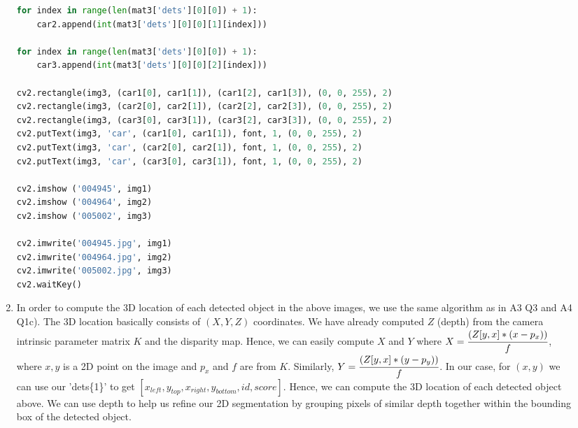 \documentclass{csc_assignment4}
\begin{document}
\begin{description}
\begin{enumerate}[label=(\alph*)]
\begin{lstlisting}[language=Python]
for index in range(len(mat3['dets'][0][0]) + 1):
    car2.append(int(mat3['dets'][0][0][1][index]))

for index in range(len(mat3['dets'][0][0]) + 1):
    car3.append(int(mat3['dets'][0][0][2][index]))

cv2.rectangle(img3, (car1[0], car1[1]), (car1[2], car1[3]), (0, 0, 255), 2)
cv2.rectangle(img3, (car2[0], car2[1]), (car2[2], car2[3]), (0, 0, 255), 2)
cv2.rectangle(img3, (car3[0], car3[1]), (car3[2], car3[3]), (0, 0, 255), 2)
cv2.putText(img3, 'car', (car1[0], car1[1]), font, 1, (0, 0, 255), 2)
cv2.putText(img3, 'car', (car2[0], car2[1]), font, 1, (0, 0, 255), 2)
cv2.putText(img3, 'car', (car3[0], car3[1]), font, 1, (0, 0, 255), 2)

cv2.imshow ('004945', img1)
cv2.imshow ('004964', img2)
cv2.imshow ('005002', img3)

cv2.imwrite('004945.jpg', img1)
cv2.imwrite('004964.jpg', img2)
cv2.imwrite('005002.jpg', img3)
cv2.waitKey()
\end{lstlisting}

\item In order to compute the 3D location of each detected object in the above images, we use the same algorithm as in A3 Q3 and A4 Q1c). The 3D location basically consists of $(X, Y, Z)$ coordinates. We have already computed $Z$ (depth) from the camera intrinsic parameter matrix $K$ and the disparity map. Hence, we can easily compute $X$ and $Y$ where
$X = \cfrac{(Z[y,x] * (x - p_{x}))}{f}$, where $x, y$ is a 2D point on the image and $p_{x}$ and $f$ are from $K$. Similarly, $Y = \cfrac{(Z[y,x] * (y - p_{y}))}{f}$. In our case, for $(x, y)$ we can use our 'dets\{1\}' to get $[x_{left}, y_{top}, x_{right}, y_{bottom}, id, score]$. Hence, we can compute the 3D location of each detected object above. We can use depth to help us refine our 2D segmentation by grouping pixels of similar depth together within the bounding box of the detected object. 
\end{enumerate}


\end{description}
\end{document}
